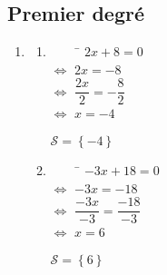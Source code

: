 \documentclass[a4paper,11pt,exos]{nsi} %
\begin{document}
\maketitle

\subsection*{Premier degré}
\exo{}
\begin{enumerate}
    \item 	\setlength{\columnseprule}{0pt}
    \begin{multicols}{2}
        \begin{enumerate}[label=\textbullet]
            \item 	\begin{tabbing}
                $\qquad$ \= $2x+8=0$\\
                $\Longleftrightarrow$   \>  $2x=-8$\\
                $\Longleftrightarrow$   \>  $\dfrac{2x}{2}=-\dfrac{8}{2}$\\
                $\Longleftrightarrow$   \>  $x=-4$
            \end{tabbing}
            $\mathcal{S}=\left\{-4\right\}$
            \item 	\begin{tabbing}
                $\qquad$ \= $-3x+18=0$\\
                $\Longleftrightarrow$   \>  $-3x=-18$\\
                $\Longleftrightarrow$   \>  $\dfrac{-3x}{-3}=\dfrac{-18}{-3}$\\
                $\Longleftrightarrow$   \>  $x=6$
            \end{tabbing}
            $\mathcal{S}=\left\{6\right\}$
            \vfill\null
            \columnbreak


\end{enumerate}
\end{multicols}
\end{enumerate}
\end{document}
